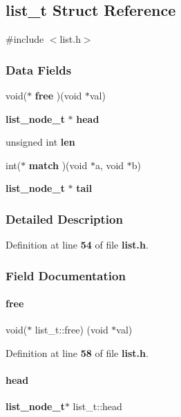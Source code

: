 \subsection{list\+\_\+t Struct Reference}
\label{a00171}


{\ttfamily \#include $<$list.\+h$>$}

\subsubsection*{Data Fields}
\begin{DoxyCompactItemize}
\item 
void($\ast$ \textbf{ free} )(void $\ast$val)
\item 
\textbf{ list\+\_\+node\+\_\+t} $\ast$ \textbf{ head}
\item 
unsigned int \textbf{ len}
\item 
int($\ast$ \textbf{ match} )(void $\ast$a, void $\ast$b)
\item 
\textbf{ list\+\_\+node\+\_\+t} $\ast$ \textbf{ tail}
\end{DoxyCompactItemize}


\subsubsection{Detailed Description}


Definition at line \textbf{ 54} of file \textbf{ list.\+h}.



\subsubsection{Field Documentation}
\mbox{\label{a00171_adbc5f9e0707a09a027c89218ff0a8f69}} 
\paragraph{free}
{\footnotesize\ttfamily void($\ast$ list\+\_\+t\+::free) (void $\ast$val)}



Definition at line \textbf{ 58} of file \textbf{ list.\+h}.

\mbox{\label{a00171_a93ef6d995af96e73e226dc2b8a7232aa}} 
\paragraph{head}
{\footnotesize\ttfamily \textbf{ list\+\_\+node\+\_\+t}$\ast$ list\+\_\+t\+::head}



